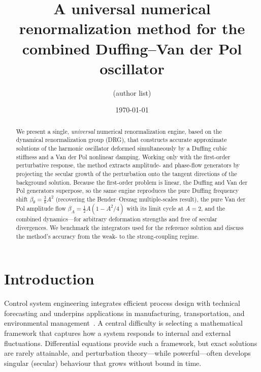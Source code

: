\documentclass[aps,pre,twocolumn,showpacks,nofootinbib,superscriptaddress]{revtex4-2}
\begin{document}
\title{A universal numerical renormalization method for the\\
       combined Duffing--Van der Pol oscillator}

\author{(author list)}

\date{\today}

\begin{abstract}
We present a single, \emph{universal} numerical renormalization engine, based
on the dynamical renormalization group (DRG), that constructs accurate
approximate solutions of the harmonic oscillator deformed simultaneously by a
Duffing cubic stiffness and a Van der Pol nonlinear damping. Working only with
the first-order perturbative response, the method extracts amplitude- and
phase-flow generators by projecting the secular growth of the perturbation onto
the tangent directions of the background solution. Because the first-order
problem is linear, the Duffing and Van der Pol generators superpose, so the
same engine reproduces the pure Duffing frequency shift
$\beta_\theta=\tfrac38 A^2$ (recovering the Bender--Orszag multiple-scales
result), the pure Van der Pol amplitude flow $\beta_A=\tfrac12 A(1-A^2/4)$ with
its limit cycle at $A=2$, and the combined dynamics---for arbitrary deformation
strengths and free of secular divergences. We benchmark the integrators used
for the reference solution and discuss the method's accuracy from the weak- to
the strong-coupling regime.
\end{abstract}

\maketitle

\section{Introduction}
\label{sec:intro}

Control system engineering integrates efficient process design with technical
forecasting and underpins applications in manufacturing, transportation, and
environmental management~\cite{dorf2018}. A central difficulty is selecting a
mathematical framework that captures how a system responds to internal and
external fluctuations. Differential equations provide such a framework, but
exact solutions are rarely attainable, and perturbation theory---while
powerful---often develops singular (secular) behaviour that grows without bound
in time.
\end{document}
